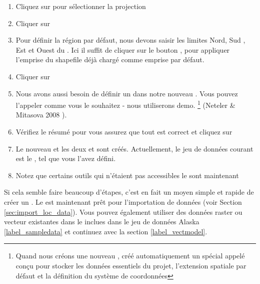 \begin{enumerate}
  \item Cliquez sur  pour sélectionner la projection
  \item Cliquer sur 
  \item Pour définir la région par défaut, nous devons saisir les limites Nord, Sud , Est et Ouest du . Ici il suffit de cliquer sur le bouton , pour appliquer l'emprise du shapefile  déjà chargé comme emprise par défaut.
  \item Cliquer sur 
  \item Nous avons aussi besoin de définir un  dans notre nouveau . Vous pouvez l'appeler comme vous le souhaitez - nous utiliserons demo. \footnote{Quand nous créons une nouveau , \grass créé automatiquement un  spécial appelé  conçu pour stocker les données essentiels du projet, l'extension spatiale par défaut et la définition du système de coordonnées} (Neteler \& Mitasova 2008  \cite{neteler_mitasova08}).
  \item Vérifiez le résumé pour vous assurez que tout est correct et cliquez sur 
  \item Le nouveau  et les deux  et  sont créés. Actuellement, le jeu de données courant est le , tel que vous l'avez défini.
  \item Notez que certains outils qui n'étaient pas accessibles le sont maintenant
\end{enumerate}

Si cela semble faire beaucoup d'étapes, c'est en fait un moyen simple et rapide de créer un . Le  est maintenant prêt pour l'importation de données (voir Section \ref{sec:import_loc_data}). Vous pouvez également utiliser des données raster ou vecteur existantes dans le  inclues dans le jeu de données \qg Alaska \ref{label_sampledata} et continuez avec la section \ref{label_vectmodel}.

